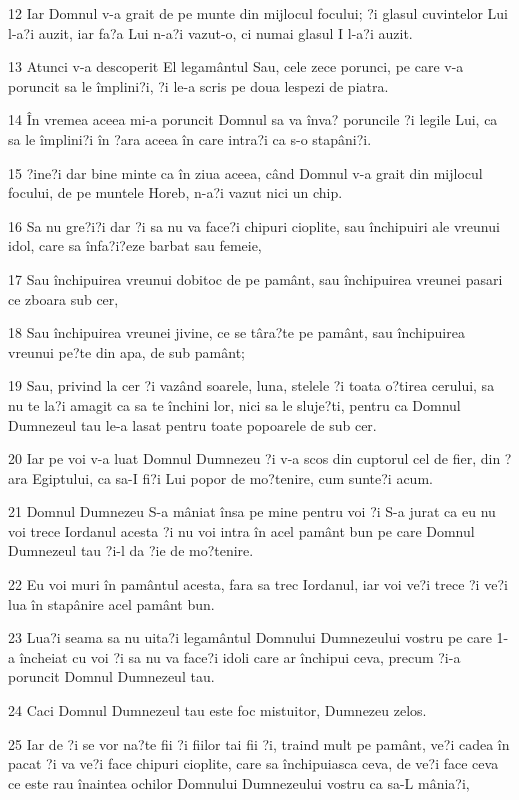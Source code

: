 \par 12 Iar Domnul v-a grait de pe munte din mijlocul focului; ?i glasul cuvintelor Lui l-a?i auzit, iar fa?a Lui n-a?i vazut-o, ci numai glasul I l-a?i auzit.
\par 13 Atunci v-a descoperit El legamântul Sau, cele zece porunci, pe care v-a poruncit sa le împlini?i, ?i le-a scris pe doua lespezi de piatra.
\par 14 În vremea aceea mi-a poruncit Domnul sa va înva? poruncile ?i legile Lui, ca sa le împlini?i în ?ara aceea în care intra?i ca s-o stapâni?i.
\par 15 ?ine?i dar bine minte ca în ziua aceea, când Domnul v-a grait din mijlocul focului, de pe muntele Horeb, n-a?i vazut nici un chip.
\par 16 Sa nu gre?i?i dar ?i sa nu va face?i chipuri cioplite, sau închipuiri ale vreunui idol, care sa înfa?i?eze barbat sau femeie,
\par 17 Sau închipuirea vreunui dobitoc de pe pamânt, sau închipuirea vreunei pasari ce zboara sub cer,
\par 18 Sau închipuirea vreunei jivine, ce se târa?te pe pamânt, sau închipuirea vreunui pe?te din apa, de sub pamânt;
\par 19 Sau, privind la cer ?i vazând soarele, luna, stelele ?i toata o?tirea cerului, sa nu te la?i amagit ca sa te închini lor, nici sa le sluje?ti, pentru ca Domnul Dumnezeul tau le-a lasat pentru toate popoarele de sub cer.
\par 20 Iar pe voi v-a luat Domnul Dumnezeu ?i v-a scos din cuptorul cel de fier, din ?ara Egiptului, ca sa-I fi?i Lui popor de mo?tenire, cum sunte?i acum.
\par 21 Domnul Dumnezeu S-a mâniat însa pe mine pentru voi ?i S-a jurat ca eu nu voi trece Iordanul acesta ?i nu voi intra în acel pamânt bun pe care Domnul Dumnezeul tau ?i-l da ?ie de mo?tenire.
\par 22 Eu voi muri în pamântul acesta, fara sa trec Iordanul, iar voi ve?i trece ?i ve?i lua în stapânire acel pamânt bun.
\par 23 Lua?i seama sa nu uita?i legamântul Domnului Dumnezeului vostru pe care 1-a încheiat cu voi ?i sa nu va face?i idoli care ar închipui ceva, precum ?i-a poruncit Domnul Dumnezeul tau.
\par 24 Caci Domnul Dumnezeul tau este foc mistuitor, Dumnezeu zelos.
\par 25 Iar de ?i se vor na?te fii ?i fiilor tai fii ?i, traind mult pe pamânt, ve?i cadea în pacat ?i va ve?i face chipuri cioplite, care sa închipuiasca ceva, de ve?i face ceva ce este rau înaintea ochilor Domnului Dumnezeului vostru ca sa-L mânia?i,
